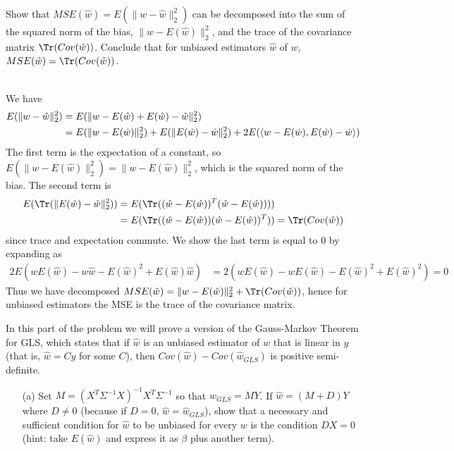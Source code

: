 \begin{Parts}
\begin{solution}
\end{solution}
\Part Show that $MSE(\hat{w})=E(\|w-\hat{w}\|_2^2)$ can be decomposed into the sum of the squared norm of the bias, $\|w-E(\hat{w})\|_2^2$, and the trace of the covariance matrix $\Tr(Cov(\hat{w}))$. Conclude that for unbiased estimators $\hat{w}$ of $w$, $MSE(\hat{w})=\Tr(Cov(\hat{w}))$.\\
\\
\begin{solution}
We have
\begin{align*}
E(\|w-\hat{w}\|_2^2)&=E(\|w-E(\hat{w})+E(\hat{w})-\hat{w}\|_2^2)\\
&=E(\|w-E(\hat{w})\|_2^2) + E(\|E(\hat{w})-\hat{w}\|_2^2)+2E(\langle w-E(\hat{w}),E(\hat{w})-\hat{w}\rangle)
\end{align*}
The first term is the expectation of a constant, so $E(\|w-E(\hat{w})\|_2^2)=\|w-E(\hat{w})\|_2^2$, which is the squared norm of the bias. The second term is 
\begin{align*}
E(\Tr(\|E(\hat{w})-\hat{w}\|_2^2))&=E(\Tr((\hat{w}-E(\hat{w}))^T(\hat{w}-E(\hat{w}))))\\
&=E(\Tr((\hat{w}-E(\hat{w}))(\hat{w}-E(\hat{w}))^T))=\Tr(Cov(\hat{w}))
\end{align*}
since trace and expectation commute. We show the last term is equal to 0 by expanding as
\begin{align*}
2E(wE(\hat{w})-w\hat{w}-E(\hat{w})^2+E(\hat{w})\hat{w})&=2(wE(\hat{w})-wE(\hat{w})-E(\hat{w})^2+E(\hat{w})^2)=0
\end{align*}
Thus we have decomposed $MSE(\hat{w})=\|w-E(\hat{w})\|_2^2+\Tr(Cov(\hat{w}))$, hence for unbiased estimators the MSE is the trace of the covariance matrix.
\end{solution}
\Part In this part of the problem we will prove a version of the Gauss-Markov Theorem for GLS, which states that if $\hat{w}$ is an unbiased estimator of $w$ that is linear in $y$ (that is, $\hat{w}=Cy$ for some $C$), then $Cov(\hat{w})-Cov(\hat{w}_{GLS})$ is positive semi-definite.
\begin{itemize}
	\item[(a)] Set $M=(X^T\Sigma^{-1}X)^{-1}X^T\Sigma^{-1}$ so that $\hat{w}_{GLS}=MY$. If $\hat{w}=(M+D)Y$ where $D\neq 0$ (because if $D = 0$, $\hat{w} = \hat{w}_{GLS}$), show that a necessary and sufficient condition for $\hat{w}$ to be unbiased for every $w$ is the condition $DX=0$ (hint: take $E(\hat{w})$ and express it as $\beta$ plus another term).
	\\
	\\

\end{itemize}
\end{Parts}
